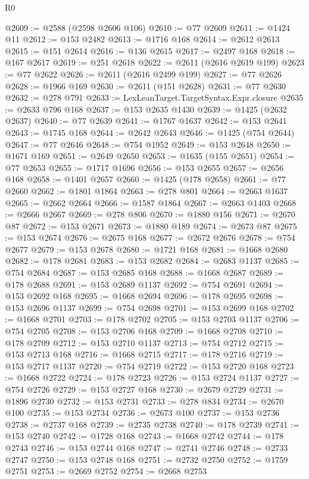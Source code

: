 \begin{lexlean}{R0}
\begin{coremodule}
@2609 := @2588 (@2598 @2606 @106)
@2610 := @77 @2609
@2611 := @1424 @11
@2612 := @153 @2482
@2613 := @1716 @168
@2614 := @2612 @2613
@2615 := @151 @2614
@2616 := @136 @2615
@2617 := @2497 @168
@2618 := @167 @2617
@2619 := @251 @2618
@2622 := @2611 (@2616 @2619 @199)
@2623 := @77 @2622
@2626 := @2611 (@2616 @2499 @199)
@2627 := @77 @2626
@2628 := @1966 @169
@2630 := @2611 (@151 @2628)
@2631 := @77 @2630
@2632 := @278 @791
@2633 := LexLeanTarget.TargetSyntax.Expr.closure
@2635 := @2633 @796 @168
@2637 := @153 @2635 @1430
@2639 := @1425 (@2632 @2637)
@2640 := @77 @2639
@2641 := @1767 @1637
@2642 := @153 @2641
@2643 := @1745 @168
@2644 := @2642 @2643
@2646 := @1425 (@754 @2644)
@2647 := @77 @2646
@2648 := @754 @1952
@2649 := @153 @2648
@2650 := @1671 @169
@2651 := @2649 @2650
@2653 := @1635 (@155 @2651)
@2654 := @77 @2653
@2655 := @1717 @1696
@2656 := @153 @2655
@2657 := @2656 @168
@2658 := @1401 @2657
@2660 := @1425 (@178 @2658)
@2661 := @77 @2660
@2662 := @1801 @1864
@2663 := @278 @801
@2664 := @2663 @1637
@2665 := @2662 @2664
@2666 := @1587 @1864
@2667 := @2663 @1403
@2668 := @2666 @2667
@2669 := @278 @806
@2670 := @1880 @156
@2671 := @2670 @87
@2672 := @153 @2671
@2673 := @1880 @189
@2674 := @2673 @87
@2675 := @153 @2674
@2676 := @2675 @168
@2677 := @2672 @2676
@2678 := @754 @2677
@2679 := @153 @2678
@2680 := @1721 @168
@2681 := @1668 @2680
@2682 := @178 @2681
@2683 := @153 @2682
@2684 := @2683 @1137
@2685 := @754 @2684
@2687 := @153 @2685 @168
@2688 := @1668 @2687
@2689 := @178 @2688
@2691 := @153 @2689 @1137
@2692 := @754 @2691
@2694 := @153 @2692 @168
@2695 := @1668 @2694
@2696 := @178 @2695
@2698 := @153 @2696 @1137
@2699 := @754 @2698
@2701 := @153 @2699 @168
@2702 := @1668 @2701
@2703 := @178 @2702
@2705 := @153 @2703 @1137
@2706 := @754 @2705
@2708 := @153 @2706 @168
@2709 := @1668 @2708
@2710 := @178 @2709
@2712 := @153 @2710 @1137
@2713 := @754 @2712
@2715 := @153 @2713 @168
@2716 := @1668 @2715
@2717 := @178 @2716
@2719 := @153 @2717 @1137
@2720 := @754 @2719
@2722 := @153 @2720 @168
@2723 := @1668 @2722
@2724 := @178 @2723
@2726 := @153 @2724 @1137
@2727 := @754 @2726
@2729 := @153 @2727 @168
@2730 := @2679 @2729
@2731 := @1896 @2730
@2732 := @153 @2731
@2733 := @278 @834
@2734 := @2670 @100
@2735 := @153 @2734
@2736 := @2673 @100
@2737 := @153 @2736
@2738 := @2737 @168
@2739 := @2735 @2738
@2740 := @178 @2739
@2741 := @153 @2740
@2742 := @1728 @168
@2743 := @1668 @2742
@2744 := @178 @2743
@2746 := @153 @2744 @168
@2747 := @2741 @2746
@2748 := @2733 @2747
@2750 := @153 @2748 @168
@2751 := @2732 @2750
@2752 := @1759 @2751
@2753 := @2669 @2752
@2754 := @2668 @2753

\end{coremodule}
\end{lexlean}
